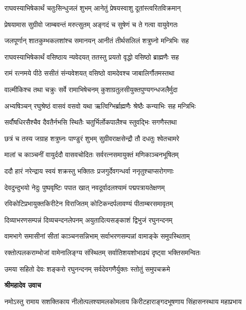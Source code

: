 \twolineshloka
{राघवस्याभिषेकार्थं चतुःसिन्धुजलं शुभम्}
{आनेतुं प्रेषयस्वाशु दूतांस्त्वरितविक्रमान्} %

\twolineshloka
{प्रेषयामास सुग्रीवो जाम्बवन्तं मरुत्सुतम्}
{अङ्गदं च सुषेणं च ते गत्वा वायुवेगतः} %

\twolineshloka
{जलपूर्णान् शातकुम्भकलशांश्च समानयन्}
{आनीतं तीर्थसलिलं शत्रुघ्नो मन्त्रिभिः सह} %

\twolineshloka
{राघवस्याभिषेकार्थं वसिष्ठाय न्यवेदयत्}
{ततस्तु प्रयतो वृद्धो वसिष्ठो ब्राह्मणैः सह} %

\twolineshloka
{रामं रत्नमये पीठे ससीतं संन्यवेशयत्}
{वसिष्ठो वामदेवश्च जाबालिर्गौतमस्तथा} %

\twolineshloka
{वाल्मीकिश्च तथा चक्रुः सर्वे रामाभिषेचनम्}
{कुशाग्रतुलसीयुक्तपुण्यगन्धजलैर्मुदा} %

\twolineshloka
{अभ्यषिञ्चन् रघुश्रेष्ठं वासवं वसवो यथा}
{ऋत्विग्भिर्ब्राह्मणैः श्रेष्ठैः कन्याभिः सह मन्त्रिभिः} %

\twolineshloka
{सर्वौषधिरसैश्चैव दैवतैर्नभसि स्थितैः}
{चतुर्भिर्लोकपालैश्च स्तुवद्भिः सगणैस्तथा} %

\twolineshloka
{छत्रं च तस्य जग्राह शत्रुघ्नः पाण्डुरं शुभम्}
{सुग्रीवराक्षसेन्द्रौ तौ दधतुः श्वेतचामरे} %

\twolineshloka
{मालां च काञ्चनीं वायुर्ददौ वासवचोदितः}
{सर्वरत्नसमायुक्तं मणिकाञ्चनभूषितम्} %

\twolineshloka
{ददौ हारं नरेन्द्राय स्वयं शक्रस्तु भक्तितः}
{प्रजगुर्देवगन्धर्वा ननृतुश्चाप्सरोगणाः} %

\twolineshloka
{देवदुन्दुभयो नेदुः पुष्पवृष्टिः पपात खात्}
{नवदूर्वादलश्यामं पद्मपत्रायतेक्षणम्} %

\twolineshloka
{रविकोटिप्रभायुक्तकिरीटेन विराजितम्}
{कोटिकन्दर्पलावण्यं पीताम्बरसमावृतम्} %

\twolineshloka
{दिव्याभरणसम्पन्नं दिव्यचन्दनलेपनम्}
{अयुतादित्यसङ्काशं द्विभुजं रघुनन्दनम्} %

\twolineshloka
{वामभागे समासीनां सीतां काञ्चनसन्निभाम्}
{सर्वाभरणसम्पन्नां वामाङ्के समुपस्थिताम्} %

\twolineshloka
{रक्तोत्पलकराम्भोजां वामेनालिङ्ग्य संस्थितम्}
{सर्वातिशयशोभाढ्यं दृष्ट्वा भक्तिसमन्वितः} %

\twolineshloka
{उमया सहितो देवः शङ्करो रघुनन्दनम्}
{सर्वदेवगणैर्युक्तः स्तोतुं समुपचक्रमे} %

\textbf{श्रीमहादेव उवाच}

\fourlineindentedshloka
{नमोऽस्तु रामाय सशक्तिकाय}
{नीलोत्पलश्यामलकोमलाय}
{किरीटहाराङ्गदभूषणाय}
{सिंहासनस्थाय महाप्रभाय} %

